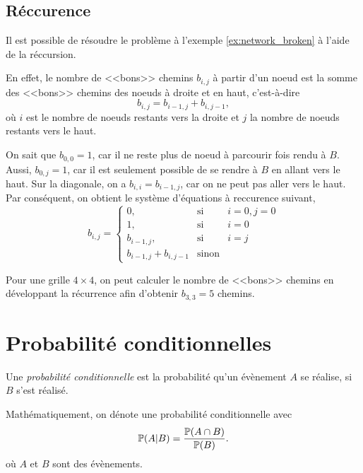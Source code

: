 \documentclass[11pt]{article}
\renewcommand\P{%
	\ensuremath{%
		\mathbb{P}%
	}%
}%
\begin{document}
\subsection{Réccurence}
\begin{exemple}
	Il est possible de résoudre le problème à l'exemple \ref{ex:network_broken}
	à l'aide de la réccursion.
	
	En effet, le nombre de <<bons>> chemins $b_{i,j}$ à partir d'un noeud est
	la somme des <<bons>> chemins des noeuds à droite et en haut, c'est-à-dire
	\begin{equation*}
		b_{i,j}=b_{i-1,j}+b_{i,j-1},
	\end{equation*}
	où $i$ est le nombre de noeuds restants vers la droite et $j$ la nombre de
	noeuds restants vers le haut.

	On sait que $b_{0,0}=1$, car il ne reste plus de noeud à parcourir fois
	rendu à $B$. Aussi, $b_{0,j}=1$, car il est seulement possible de se rendre
	à $B$ en allant vers le haut. Sur la diagonale, on a $b_{i,i}=b_{i-1,j}$,
	car on ne peut pas aller vers le haut. Par conséquent, on obtient le
	système d'équations à reccurence suivant,
	\begin{equation*}
		b_{i,j}=\left\{
			\begin{matrix}
				0,                 &\text{si}&i=0,j=0\\
				1,                 &\text{si}&i=0\\
				b_{i-1,j},         &\text{si}&i=j\\
				b_{i-1,j}+b_{i,j-1}&\text{sinon}
			\end{matrix}
		\right.
	\end{equation*}

	Pour une grille $4\times 4$, on peut calculer le nombre de <<bons>> chemins
	en développant la récurrence afin d'obtenir $b_{3,3}=5$ chemins.
\end{exemple}

\section{Probabilité conditionnelles}
\begin{definition}
	Une \textit{probabilité conditionnelle} est la probabilité qu'un évènement
	$A$ se réalise, si $B$ s'est réalisé.
\end{definition}

Mathématiquement, on dénote une probabilité conditionnelle avec
\begin{equation*}
	\P(A|B)=\frac{\P(A\cap B)}{\P(B)}.
\end{equation*}
où $A$ et $B$ sont des évènements.
\end{document}
